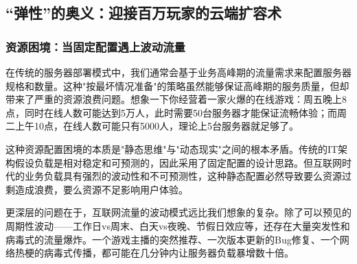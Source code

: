 
\subsection{“弹性”的奥义：迎接百万玩家的云端扩容术}

\subsubsection{资源困境：当固定配置遇上波动流量}

在传统的服务器部署模式中，我们通常会基于业务高峰期的流量需求来配置服务器规格和数量。这种"按最坏情况准备"的策略虽然能够保证高峰期的服务质量，但却带来了严重的资源浪费问题。想象一下你经营着一家火爆的在线游戏：周五晚上8点，同时在线人数可能达到5万人，此时需要50台服务器才能保证流畅体验；而周二上午10点，在线人数可能只有5000人，理论上5台服务器就足够了。

这种资源配置困境的本质是"静态思维"与"动态现实"之间的根本矛盾。传统的IT架构假设负载是相对稳定和可预测的，因此采用了固定配置的设计思路。但互联网时代的业务负载具有强烈的波动性和不可预测性，这种静态配置必然导致要么资源过剩造成浪费，要么资源不足影响用户体验。

更深层的问题在于，互联网流量的波动模式远比我们想象的复杂。除了可以预见的周期性波动——工作日vs周末、白天vs夜晚、节假日效应等，还存在大量突发性和病毒式的流量爆炸。一个游戏主播的突然推荐、一次版本更新的Bug修复、一个网络热梗的病毒式传播，都可能在几分钟内让服务器负载暴增数十倍。

